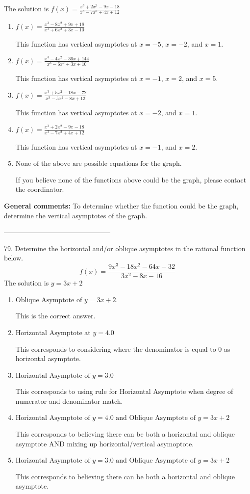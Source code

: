 \documentclass{extbook}[14pt]
\begin{document}
The solution is $ f(x) = \frac{x^{3} +2 x^{2} -9 x -18}{x^{3} -7 x^{2} +4 x + 12} $ 

\begin{enumerate}[label=\Alph*.] 
\item $ f(x) = \frac{x^{3} -8 x^{2} +9 x + 18}{x^{3} +6 x^{2} +3 x -10} $ 

 This function has vertical asymptotes at $x=-5$, $x=-2$, and $x=1$. 
\item $ f(x) = \frac{x^{3} -4 x^{2} -36 x + 144}{x^{3} -6 x^{2} +3 x + 10} $ 

 This function has vertical asymptotes at $x=-1$, $x=2$, and $x=5$. 
\item $ f(x) = \frac{x^{3} +5 x^{2} -18 x -72}{x^{3} -5 x^{2} -8 x + 12} $ 

 This function has vertical asymptotes at $x=-2$, and $x=1$. 
\item $ f(x) = \frac{x^{3} +2 x^{2} -9 x -18}{x^{3} -7 x^{2} +4 x + 12} $ 

 This function has vertical asymptotes at $x=-1$, and $x=2$. 
\item $ \text{None of the above are possible equations for the graph.} $ 

 If you believe none of the functions above could be the graph, please contact the coordinator. 
\end{enumerate} 
 
\textbf{General comments:} To determine whether the function could be the graph, determine the vertical asymptotes of the graph.

-----------------------------------------------

79. Determine the horizontal and/or oblique asymptotes in the rational function below.
\[ f(x) = \frac{9x^{3} -18 x^{2} -64 x -32}{3x^{2} -8 x -16} \] 
The solution is $ y = 3x + 2 $ 

\begin{enumerate}[label=\Alph*.] 
\item $ \text{Oblique Asymptote of } y = 3x + 2. $ 

 This is the correct answer. 
\item $ \text{Horizontal Asymptote at } y = 4.0 $ 

 This corresponds to considering where the denominator is equal to 0 as horizontal asymptote. 
\item $ \text{Horizontal Asymptote of } y = 3.0  $ 

 This corresponds to using rule for Horizontal Asymptote when degree of numerator and denominator match. 
\item $ \text{Horizontal Asymptote of } y = 4.0 \text{ and Oblique Asymptote of } y = 3x + 2 $ 

 This corresponds to believing there can be both a horizontal and oblique asymptote AND mixing up horizontal/vertical asymoptote. 
\item $ \text{Horizontal Asymptote of } y = 3.0 \text{ and Oblique Asymptote of } y = 3x + 2 $ 

 This corresponds to believing there can be both a horizontal and oblique asymptote. 
\end{enumerate} 
 
\end{document}
